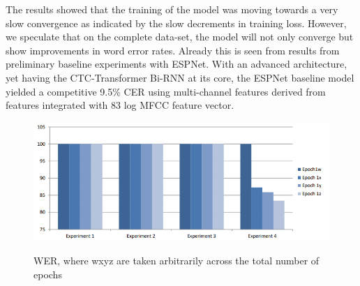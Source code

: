 The results showed that the training of the model was moving towards a very slow convergence as indicated by the slow decrements in training loss.  However, we speculate that on the complete data-set, the model will not only converge but show improvements in word error rates.  Already this is seen from results from preliminary baseline experiments with ESPNet.   With an advanced architecture, yet having the CTC-Transformer Bi-RNN at its core, the ESPNet baseline model yielded a competitive 9.5\% CER using multi-channel features derived from features integrated with 83 log MFCC feature vector.

\begin{figure}
\centering
  \includegraphics[width=14cm]{thesis/images/res01.PNG}\\
  \caption{WER, where w\<x\<y\<z are taken arbitrarily across the total
number of epochs} \label{fig_6_3_wer}
\end{figure}
